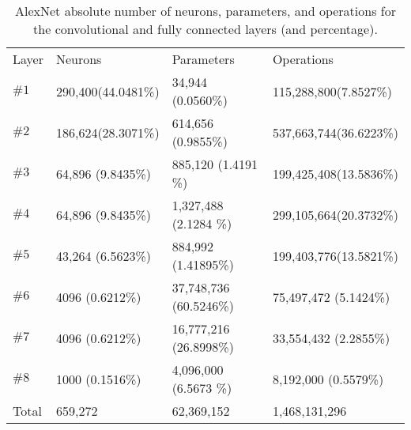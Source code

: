 \documentclass[12pt] {article}
\begin{document}
\begin{table}[tbh]
 \centering    
\begin{tabular}{ |p{1.5cm}||p{4.2cm}|p{4.2cm}|p{4.2cm}|}
 \hline
  Layer & Neurons & Parameters  & Operations \\ \hhline{|=|=|=|=|}
 \hline
  $\#1$   &  290,400(44.0481\%)&  34,944     (0.0560\%)&  115,288,800(7.8527\%) \\
   \hline                                                            
  $\#2$   &  186,624(28.3071\%)&  614,656    (0.9855\%)&  537,663,744(36.6223\%)\\
   \hline                                                            
  $\#3$   &  64,896 (9.8435\%)&  885,120    (1.4191 \%)&  199,425,408(13.5836\%)\\
   \hline                                                            
  $\#4$   &  64,896 (9.8435\%)&  1,327,488  (2.1284 \%)&  299,105,664(20.3732\%)\\
   \hline                                                            
  $\#5$   &  43,264 (6.5623\%) &  884,992   (1.41895\%)&  199,403,776(13.5821\%) \\
   \hline                                                            
  $\#6$   &  4096   (0.6212\%)&  37,748,736 (60.5246\%)&  75,497,472 (5.1424\%) \\
   \hline                                                            
  $\#7$   &  4096   (0.6212\%)&  16,777,216 (26.8998\%)&  33,554,432 (2.2855\%)  \\
   \hline                                                             
  $\#8$   &  1000   (0.1516\%)&  4,096,000  (6.5673 \%)&  8,192,000  (0.5579\%)  \\ \hhline{|=|=|=|=|}
  Total   &  659,272 & 62,369,152  &  1,468,131,296 \\ 
 \hline
\end{tabular} 
\caption{AlexNet absolute number of neurons, parameters, and operations for the convolutional and fully connected layers (and percentage).}
   \label{tab:metric}
\end{table} 
\end{document}
